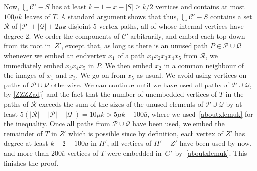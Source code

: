 \documentclass[12pt]{article}
\begin{document}
Now, $\bigcup\mathcal C'-S$  has  at least $k-1-x-|S|\ge k/2$ vertices and contains at most 
$100 \mu k$ leaves of $T$. A standard argument shows that thus, $\bigcup\mathcal C'-S$ contains a set $\mathcal R$ of $|\mathcal P|+|\mathcal Q|+2\mu k$ disjoint 5-vertex paths, all of whose internal vertices have degree 
2. We order the components of $\mathcal C'$ arbitrarily, and  embed each top-down from its root in~$Z'$,   except that, 
as long as there is an unused path  $P\in {\mathcal P} \cup {\mathcal Q}$ whenever we embed  an endvertex $x_1$ of a path $x_1x_2x_3x_4x_5$ from $\mathcal R$, we immediately embed $x_3x_4x_5$ in $P$. We then embed $x_2$ in a common neighbour of the images of $x_1$ and $x_3$. We go on from $x_5$ as usual. We avoid using   vertices on   paths of ${\mathcal P} \cup { \mathcal Q}$ otherwise. We can  continue until we have used all  paths of  ${\mathcal P} \cup { \mathcal Q}$, by \eqref{ZZZZadj} and the fact that the  number of unembedded vertices of $T$ in the paths of $\mathcal R$ exceeds the sum of the sizes of the unused elements of $\mathcal{P} \cup {\mathcal Q}$ by at least  $5(|\mathcal R|-|\mathcal P|-|\mathcal Q|)= 10\mu k > 5\mu k+ 100\bar a$, where we used~\eqref{aboutxlemuk} for the inequality.   Once all paths from  $\mathcal P\cup \mathcal Q$ have been used, we embed the remainder of $T$ in $Z'$ which is possible since by definition, each vertex of $Z'$ has degree at least $k-2-100\bar a$ in $H'$, all vertices of $H'-Z'$ have been used by now, and more than $200\bar a$ vertices of $T$ were embedded in~$G'$ by~\eqref{aboutxlemuk}.
This finishes  
 the proof.


   
  
\end{document}
